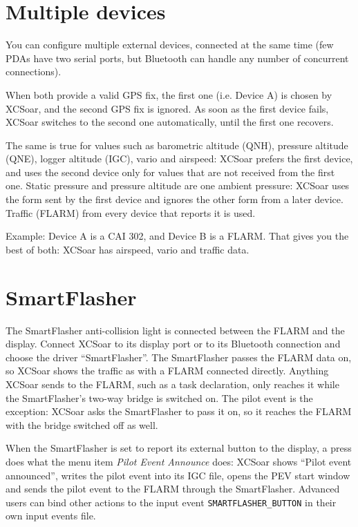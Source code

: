 \section{Multiple devices}

You can configure multiple external devices, connected at the same
time (few PDAs have two serial ports, but Bluetooth can handle any
number of concurrent connections).

When both provide a valid GPS fix, the first one (i.e. Device A) is chosen by
XCSoar, and the second GPS fix is ignored.  As soon as the first device fails,
XCSoar switches to the second one automatically, until the first one recovers.

The same is true for values such as barometric altitude (QNH),
pressure altitude (QNE), logger altitude (IGC), vario and
airspeed: XCSoar prefers the first device, and uses the second
device only for values that are not received from the first one.
Static pressure and pressure altitude are one ambient pressure:
XCSoar uses the form sent by the first device and ignores the other
form from a later device.
Traffic (FLARM) from every device that reports it is used.

Example: Device A is a CAI 302, and Device B is a FLARM.
That gives you the best of both: XCSoar has airspeed, vario and
traffic data.

\section{SmartFlasher}

The SmartFlasher anti-collision light is connected between the FLARM and
the display.  Connect XCSoar to its display port or to its Bluetooth
connection and choose the driver ``SmartFlasher''.  The SmartFlasher
passes the FLARM data on, so XCSoar shows the traffic as with a FLARM
connected directly.  Anything XCSoar sends to the FLARM, such as a task
declaration, only reaches it while the SmartFlasher's two-way bridge is
switched on.  The pilot event is the exception: XCSoar asks the
SmartFlasher to pass it on, so it reaches the FLARM with the bridge
switched off as well.

When the SmartFlasher is set to report its external button to the
display, a press does what the menu item \emph{Pilot Event Announce}
does: XCSoar shows ``Pilot event announced'', writes the pilot event
into its IGC file, opens the PEV start window and sends the pilot event
to the FLARM through the SmartFlasher.  Advanced users can bind other
actions to the input event \texttt{SMARTFLASHER\_BUTTON} in their own
input events file.

